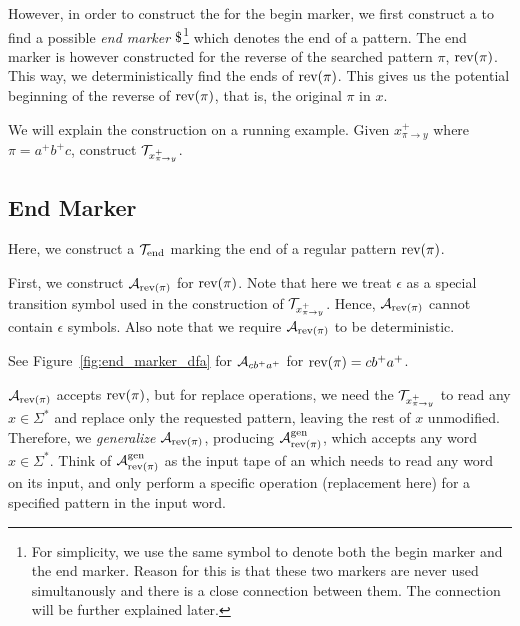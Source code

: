 However, in order to construct the \nft for the begin marker, we first construct a \dft to find a possible \emph{end marker} $\marker$\footnote{For simplicity, we use the same symbol to denote both the begin marker and the end marker. Reason for this is that these two markers are never used simultanously and there is a close connection between them. The connection will be further explained later.} which denotes the end of a pattern.
The end marker \dft is however constructed for the reverse of the searched pattern $\pi$, $\text{rev(}\pi\text{)}$.
This way, we deterministically find the ends of $\text{rev(}\pi\text{)}$.
This gives us the potential beginning of the reverse of $\text{rev(}\pi\text{)}$, that is, the original $\pi$ in $x$.

We will explain the construction on a running example.
Given $x^{+}_{\pi \rightarrow y}$ where $\pi = a^+b^+c$, construct $\mathcal{T}_{x^{+}_{\pi \rightarrow y}}$.

\subsection{End Marker \dft}
Here, we construct a \dft $\mathcal{T}_{\text{end}}$ marking the end of a regular pattern $\text{rev(}\pi\text{)}$.

First, we construct \dfa $\mathcal{A}_{\text{rev(}\pi\text{)}}$ for $\text{rev(}\pi\text{)}$.
Note that here we treat $\epsilon$ as a special transition symbol used in the construction of $\mathcal{T}_{x^{+}_{\pi \rightarrow y}}$.
Hence, $\mathcal{A}_{\text{rev(}\pi\text{)}}$ cannot contain $\epsilon$ symbols.
Also note that we require $\mathcal{A}_{\text{rev(}\pi\text{)}}$ to be deterministic.

See Figure~\ref{fig:end_marker_dfa} for \dfa $\mathcal{A}_{cb^+a^+}$ for $\text{rev(}\pi\text{)} = cb^+a^+$.


$\mathcal{A}_{\text{rev(}\pi\text{)}}$ accepts $\text{rev(}\pi\text{)}$, but for replace operations, we need the $\mathcal{T}_{x^{+}_{\pi \rightarrow y}}$ to read any $x \in \Sigma^*$ and replace only the requested pattern, leaving the rest of $x$ unmodified.
Therefore, we \emph{generalize} $\mathcal{A}_{\text{rev(}\pi\text{)}}$, producing $\mathcal{A}^{\text{gen}}_{\text{rev(}\pi\text{)}}$, which accepts any word $x \in \Sigma^*$.
Think of $\mathcal{A}^{\text{gen}}_{\text{rev(}\pi\text{)}}$ as the input tape of an \nft which needs to read any word on its input, and only perform a specific operation (replacement here) for a specified pattern in the input word.

